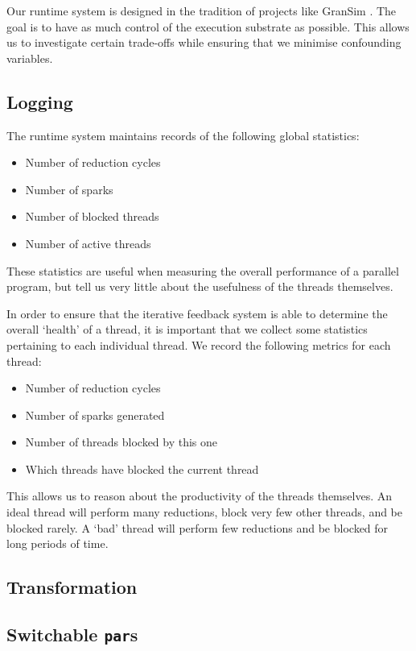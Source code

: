 Our runtime system is designed in the tradition of projects like GranSim
\citep{gransim}. The goal is to have as much control of the execution substrate
as possible. This allows us to investigate certain trade-offs while ensuring
that we minimise confounding variables.

\subsection*{Logging}
    The runtime system maintains records of the following global statistics:

    \begin{itemize}
        \item Number of reduction cycles
        \item Number of sparks
        \item Number of blocked threads
        \item Number of active threads
    \end{itemize}

    These statistics are useful when measuring the overall performance of a
parallel program, but tell us very little about the usefulness of the threads
themselves.

    In order to ensure that the iterative feedback system is able to determine
the overall `health' of a thread, it is important that we collect some
statistics pertaining to each individual thread. We record the following metrics
for each thread:
    \begin{itemize}
        \item Number of reduction cycles
        \item Number of sparks generated
        \item Number of threads blocked by this one
        \item Which threads have blocked the current thread
    \end{itemize}

    This allows us to reason about the productivity of the threads themselves.
An ideal thread will perform many reductions, block very few other threads, and
be blocked rarely. A `bad' thread will perform few reductions and be blocked for
long periods of time.

\subsection*{Transformation}

\subsection{Switchable \texttt{par}s}
\label{sec:switchPar}

